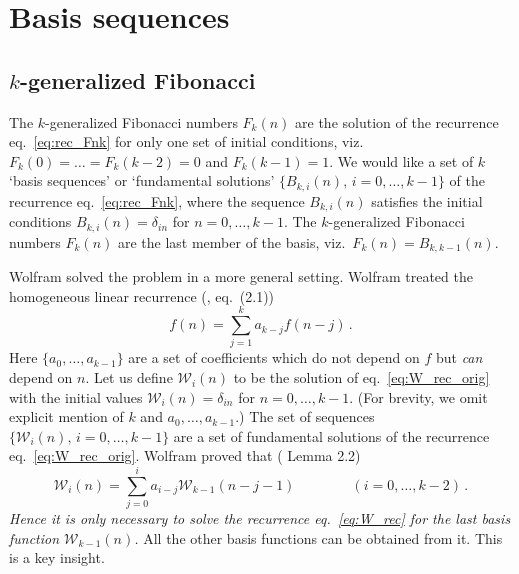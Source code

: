 \documentclass[review]{elsarticle}
\theoremstyle{plain}
\begin{document}
\setcounter{equation}{0}
\section{Basis sequences}\label{sec:basis_seq}
\subsection{$k$-generalized Fibonacci}
The $k$-generalized Fibonacci numbers $F_k(n)$ are the solution
of the recurrence eq.~\eqref{eq:rec_Fnk} for only one set of initial conditions,
viz.~$F_k(0)=\dots=F_k(k-2)=0$ and $F_k(k-1)=1$.
We would like a set of $k$ `basis sequences' or `fundamental solutions'
$\{B_{k,i}(n),\,i=0,\dots,k-1\}$
of the recurrence eq.~\eqref{eq:rec_Fnk},
where the sequence $B_{k,i}(n)$ satisfies the initial conditions
$B_{k,i}(n) = \delta_{in}$ for $n=0,\dots,k-1$.
The $k$-generalized Fibonacci numbers $F_k(n)$
are the last member of the basis, viz.~$F_k(n) = B_{k,k-1}(n)$.

Wolfram \cite{Wolfram2000} solved the problem in a more general setting.
Wolfram treated the homogeneous linear recurrence (\cite{Wolfram2000}, eq.~(2.1))
\begin{equation}
\label{eq:W_rec_orig}
f(n) = \sum_{j=1}^k a_{k-j} f(n-j) \,.
\end{equation}
Here $\{a_0,\dots,a_{k-1}\}$ are a set of coefficients which do not depend on $f$ but \emph{can} depend on $n$.
Let us define $\mathscr{W}_i(n)$ to be the solution of
eq.~\eqref{eq:W_rec_orig} with the initial values
$\mathscr{W}_i(n) = \delta_{in}$ for $n=0,\dots,k-1$.
(For brevity, we omit explicit mention of $k$ and $a_0,\dots,a_{k-1}$.)
The set of sequences $\{\mathscr{W}_i(n),\,i=0,\dots,k-1\}$ are a set of
fundamental solutions of the recurrence eq.~\eqref{eq:W_rec_orig}.
Wolfram proved that (\cite{Wolfram2000} Lemma 2.2) 
\begin{equation}
\label{eq:W_basis_orig}
\mathscr{W}_i(n) = \sum_{j=0}^i a_{i-j} \mathscr{W}_{k-1}(n-j-1) \qquad\qquad (i=0,\dots,k-2) \,.
\end{equation}
\emph{Hence it is only necessary to solve the recurrence eq.~\eqref{eq:W_rec} for the last basis function $\mathscr{W}_{k-1}(n)$.}
All the other basis functions can be obtained from it. This is a key insight.
\end{document}

